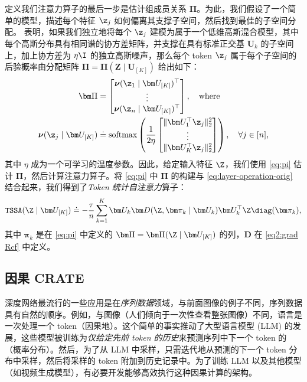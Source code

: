 \documentclass[../../book-main_zh.tex]{subfiles}
\begin{document}
定义我们注意力算子的最后一步是估计组成员关系 $\bm\Pi$。为此，我们假设了一个简单的模型，描述每个特征 \(\z_{j}\) 如何偏离其支撑子空间，然后找到最佳的子空间分配。\cite{yu2023white} 表明，如果我们独立地将每个 \(\z_{j}\) 建模为属于一个低维高斯混合模型，其中每个高斯分布具有相同谱的协方差矩阵，并支撑在具有标准正交基 \(\bm U_{k}\) 的子空间上，加上协方差为 \(\eta \I\) 的独立高斯噪声，那么每个 token \(\z_{j}\) 属于每个子空间的后验概率由分配矩阵 \(\bm \Pi = \bm \Pi(\bm Z \mid \bm
U_{[K]})\) 给出如下：
\begin{align}\label{eq:pi}
    \bm \Pi & =
    \begin{bmatrix} \boldsymbol{\nu}(\z_1 \mid \bm U_{[K]})^\top
        \\ \vdots \\ \boldsymbol{\nu}(\z_n \mid \bm U_{[K]})^\top
    \end{bmatrix}, \nonumber \quad
    \text{where} \\
    \boldsymbol{\nu}(\z_j \mid \bm U_{[K]}) &\doteq
    \operatorname{softmax}\left( \frac{1}{2\eta}
        \begin{bmatrix} \|  \bm U_{1}^{\top} \z_j \|_2^2 \\ \vdots
            \\ \| \bm U_{K}^{\top} \z_j \|_2^2
    \end{bmatrix} \right), \quad \forall j \in [n],
\end{align}
其中 $\eta$ 成为一个可学习的温度参数。因此，给定输入特征 \(\Z\)，我们使用 \eqref{eq:pi} 估计 \(\bm\Pi\)，然后计算注意力算子。将 \eqref{eq:pi} 中 $\bm\Pi$ 的构建与 \eqref{eq:layer-operation-orig} 结合起来，我们得到了{\em Token 统计自注意力}算子：
\begin{equation}
    \label{eq:tssa}
    \texttt{TSSA}(\Z \mid \bm U_{[K]}) \doteq -\frac{\tau}{n}\sum_{k
    = 1}^{K}\bm U_{k}\bm D(\Z, \bm\pi_{k} \mid \bm U_{k})\bm
    U_{k}^{\top}\Z\diag(\bm \pi_{k}),
\end{equation}
其中 \(\bm\pi_{k}\) 是在 \eqref{eq:pi} 中定义的 \(\bm\Pi = \bm\Pi(\Z \mid \bm
U_{[K]})\) 的列，\(\bm D\) 在 \eqref{eq2:grad Rcf} 中定义。

\subsection{因果 CRATE}
\label{sec:causal-crate}
深度网络最流行的一些应用是在\textit{序列数据}领域，与前面图像的例子不同，序列数据具有自然的顺序。例如，与图像（人们倾向于一次性查看整张图像）不同，语言是一次处理一个 token（因果地）。这个简单的事实推动了大型语言模型 (LLM) 的发展，这些模型被训练为\textit{仅给定先前 token 的历史}来预测序列中下一个 token 的（概率分布）。然后，为了从 LLM 中采样，只需迭代地从预测的下一个 token 分布中采样，然后将采样的 token 附加到历史记录中。为了训练 LLM 以及其他模型（如视频生成模型），有必要开发能够高效执行这种因果计算的架构。
\end{document}
